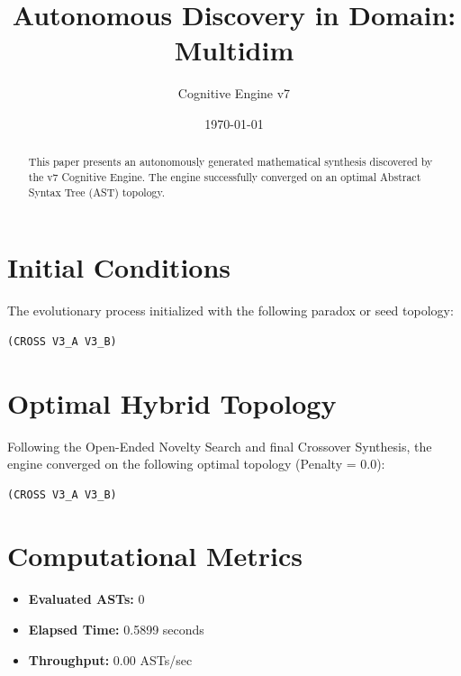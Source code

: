 \documentclass{article}
\title{Autonomous Discovery in Domain: Multidim}
\author{Cognitive Engine v7}
\date{\today}
\begin{document}
\maketitle
\begin{abstract}
This paper presents an autonomously generated mathematical synthesis discovered by the v7 Cognitive Engine. The engine successfully converged on an optimal Abstract Syntax Tree (AST) topology.\end{abstract}
\section{Initial Conditions}
The evolutionary process initialized with the following paradox or seed topology:
\begin{verbatim}
(CROSS V3_A V3_B)
\end{verbatim}
\section{Optimal Hybrid Topology}
Following the Open-Ended Novelty Search and final Crossover Synthesis, the engine converged on the following optimal topology (Penalty = 0.0):
\begin{verbatim}
(CROSS V3_A V3_B)
\end{verbatim}
\section{Computational Metrics}
\begin{itemize}
  \item \textbf{Evaluated ASTs:} 0
  \item \textbf{Elapsed Time:} 0.5899 seconds
  \item \textbf{Throughput:} 0.00 ASTs/sec
\end{itemize}
\end{document}
